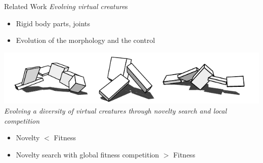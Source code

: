 \documentclass[6pt]{beamer}
\begin{document}
\begin{frame}{Related Work}
\textit{Evolving virtual creature}s~
\begin{itemize}
\item Rigid body parts, joints
\item Evolution of the morphology and the control
\end{itemize}
{\centering
\includegraphics[scale=0.4]{../Figures/Misc/evolvingVirtualCreatures.png}}\\
\textit{Evolving a diversity of virtual creatures through novelty search and local competition} ~
\begin{itemize}
\item Novelty $<$ Fitness
\item Novelty search with global fitness competition $>$ Fitness
\end{itemize}
\end{frame}
\end{document}
